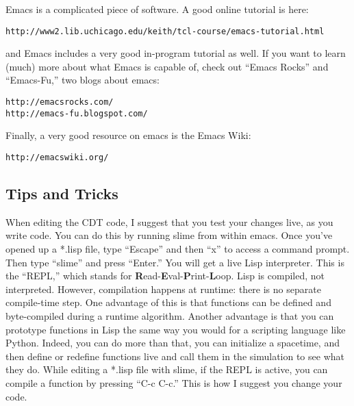 \documentclass[12pt]{article}
\begin{document}
Emacs is a complicated piece of software. A good online tutorial is
here:
\begin{verbatim}
http://www2.lib.uchicago.edu/keith/tcl-course/emacs-tutorial.html
\end{verbatim}
and Emacs includes a very good in-program tutorial as well. If you want to learn (much) more about what Emacs is capable of, check out ``Emacs Rocks'' and ``Emacs-Fu,'' two blogs about emacs:
\begin{verbatim}
http://emacsrocks.com/
http://emacs-fu.blogspot.com/
\end{verbatim}
Finally, a very good resource on emacs is the Emacs Wiki:
\begin{verbatim}
http://emacswiki.org/
\end{verbatim}

\subsection{Tips and Tricks}

When editing the CDT code, I suggest that you test your changes live,
as you write code. You can do this by running slime from within
emacs. Once you've opened up a *.lisp file, type ``Escape'' and then
``x'' to access a command prompt. Then type ``slime'' and press
``Enter.'' You will get a live Lisp interpreter. This is the ``REPL,''
which stands for
\textbf{R}ead-\textbf{E}val-\textbf{P}rint-\textbf{L}oop. Lisp is
compiled, not interpreted. However, compilation happens at runtime:
there is no separate compile-time step. One advantage of this is that
functions can be defined and byte-compiled during a runtime
algorithm. Another advantage is that you can prototype functions in
Lisp the same way you would for a scripting language like
Python. Indeed, you can do more than that, you can initialize a
spacetime, and then define or redefine functions live and call them in
the simulation to see what they do. While editing a *.lisp file with
slime, if the REPL is active, you can compile a function by pressing
``C-c C-c.'' This is how I suggest you change your code.
\end{document}
